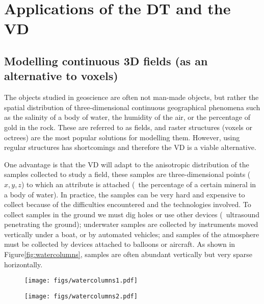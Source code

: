%
\section[Applications]{Applications of the DT and the VD}



\subsection{Modelling continuous 3D fields (as an alternative to voxels)}

The objects studied in geoscience are often not man-made objects, but rather the spatial distribution of three-dimensional continuous geographical phenomena such as the salinity of a body of water, the humidity of the air, or the percentage of gold in the rock. 
These are referred to as fields, and raster structures (voxels or octrees) are the most popular solutions for modelling them.
However, using regular structures has shortcomings and therefore the VD is a viable alternative.

One advantage is that the VD will adapt to the anisotropic distribution of the samples collected to study a field, these samples are three-dimensional points ($x,y,z$) to which an attribute is attached (\eg\ the percentage of a certain mineral in a body of water).
In practice, the samples can be very hard and expensive to collect because of the difficulties encountered and the technologies involved. 
To collect samples in the ground we must dig holes or use other devices (\eg\ ultrasound penetrating the ground); underwater samples are collected by instruments moved vertically under a boat, or by automated vehicles; and samples of the atmosphere must be collected by devices attached to balloons or aircraft. 
As shown in Figure\ref{fig:watercolumns}, samples are often abundant vertically but very sparse horizontally. 
\begin{figure*}
  \centering
  \begin{subfigure}[b]{0.38\linewidth}
    \centering
    \texttt{[image: figs/watercolumns1.pdf]}
    \caption{}
  \end{subfigure}%
  \qquad
  \begin{subfigure}[b]{0.45\linewidth}
    \centering
    \texttt{[image: figs/watercolumns2.pdf]}
    \caption{}
  \end{subfigure}
\caption{\textbf{(a)} Example of a dataset in geology, where samples were collected by drilling a hole in the ground. Each sample has a location in 3D space ($x-y-z$ coordinates) and one or more attributes attached to it. \textbf{(b)} An oceanographic dataset in the Bering Sea in which samples are distributed along water columns. Each red point represents a (vertical) water column, where samples are collected every 2m, but water columns are about 35km from each other.}%
\label{fig:watercolumns}%
\end{figure*}

